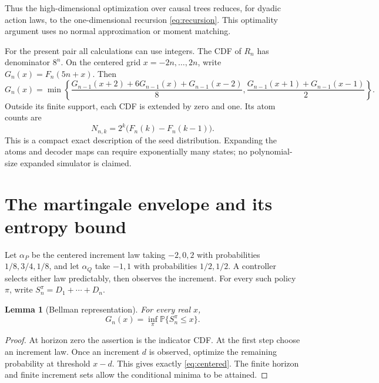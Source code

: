 \documentclass[11pt,a4paper]{article}
\newtheorem{lemma}[theorem]{Lemma}
\newcommand{\Prb}{\mathbb P}
\begin{document}
Thus the high-dimensional optimization over causal trees reduces, for
dyadic action laws, to the one-dimensional recursion \eqref{eq:recursion}.
This optimality argument uses no normal approximation or moment matching.

For the present pair all calculations can use integers. The CDF of
$R_n$ has denominator $8^n$. On the centered grid $x=-2n,\ldots,2n$,
write $G_n(x)=F_n(5n+x)$. Then
\begin{equation}\label{eq:centered}
G_n(x)=\min\left\{
\frac{G_{n-1}(x+2)+6G_{n-1}(x)+G_{n-1}(x-2)}8,
\frac{G_{n-1}(x+1)+G_{n-1}(x-1)}2\right\}.
\end{equation}
Outside its finite support, each CDF is extended by zero and one.
Its atom counts are
\[
N_{n,k}=2^k\bigl(F_n(k)-F_n(k-1)\bigr).
\]
This is a compact exact description of the seed distribution. Expanding
the atoms and decoder maps can require exponentially many states; no
polynomial-size expanded simulator is claimed.

\section{The martingale envelope and its entropy bound}
Let $\alpha_P$ be the centered increment law taking $-2,0,2$ with
probabilities $1/8,3/4,1/8$, and let $\alpha_Q$ take $-1,1$ with
probabilities $1/2,1/2$. A controller selects either law predictably,
then observes the increment. For every such policy $\pi$, write
$S_n^\pi=D_1+\cdots+D_n$.

\begin{lemma}[Bellman representation]\label{lem:bellman}
For every real $x$,
\begin{equation}\label{eq:envelope}
G_n(x)=\inf_\pi\Prb\{S_n^\pi\le x\}.
\end{equation}
\end{lemma}
\begin{proof}
At horizon zero the assertion is the indicator CDF.
At the first step choose an increment law. Once an increment $d$ is
observed, optimize the remaining probability at threshold $x-d$.
This gives exactly \eqref{eq:centered}. The finite horizon and finite
increment sets allow the conditional minima to be attained.
\end{proof}
\end{document}
